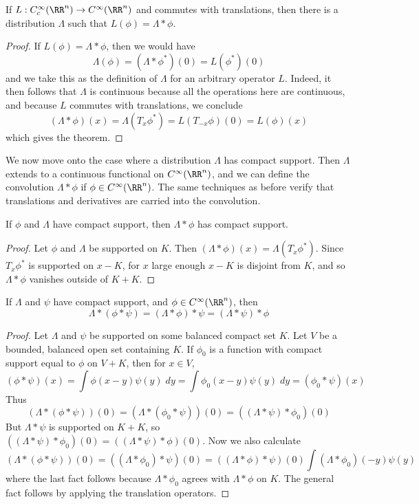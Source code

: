 \begin{theorem}
    If $L: C_c^\infty(\RR^n) \to C^\infty(\RR^n)$ and commutes with translations, then there is a distribution $\Lambda$ such that $L(\phi) = \Lambda * \phi$.
\end{theorem}
\begin{proof}
    If $L(\phi) = \Lambda * \phi$, then we would have
    \[ \Lambda(\phi) = (\Lambda * \phi^*)(0) = L(\phi^*)(0) \]
    and we take this as the definition of $\Lambda$ for an arbitrary operator $L$. Indeed, it then follows that $\Lambda$ is continuous because all the operations here are continuous, and because $L$ commutes with translations, we conclude
    \[ (\Lambda * \phi)(x) = \Lambda(T_x \phi^*) = L(T_{-x} \phi)(0) = L(\phi)(x) \]
    which gives the theorem.
\end{proof}

We now move onto the case where a distribution $\Lambda$ has compact support. Then $\Lambda$ extends to a continuous functional on $C^\infty(\RR^n)$, and we can define the convolution $\Lambda * \phi$ if $\phi \in C^\infty(\RR^n)$. The same techniques as before verify that translations and derivatives are carried into the convolution.

\begin{theorem}
    If $\phi$ and $\Lambda$ have compact support, then $\Lambda * \phi$ has compact support.
\end{theorem}
\begin{proof}
    Let $\phi$ and $\Lambda$ be supported on $K$. Then $(\Lambda * \phi)(x) = \Lambda(T_x \phi^*)$. Since $T_x \phi^*$ is supported on $x - K$, for $x$ large enough $x-K$ is disjoint from $K$, and so $\Lambda * \phi$ vanishes outside of $K + K$.
\end{proof}

\begin{theorem}
    If $\Lambda$ and $\psi$ have compact support, and $\phi \in C^\infty(\RR^n)$, then
    \[ \Lambda * (\phi * \psi) = (\Lambda * \phi) * \psi = (\Lambda * \psi) * \phi \]
\end{theorem}
\begin{proof}
    Let $\Lambda$ and $\psi$ be supported on some balanced compact set $K$. Let $V$ be a bounded, balanced open set containing $K$. If $\phi_0$ is a function with compact support equal to $\phi$ on $V + K$, then for $x \in V$,
    \[ (\phi * \psi)(x) = \int \phi(x - y) \psi(y)\; dy = \int \phi_0(x - y) \psi(y)\; dy = (\phi_0 * \psi)(x) \]
    Thus
    \[ (\Lambda * (\phi * \psi))(0) = (\Lambda * (\phi_0 * \psi))(0) = ((\Lambda * \psi) * \phi_0)(0) \]
    But $\Lambda * \psi$ is supported on $K + K$, so $((\Lambda * \psi) * \phi_0)(0) = ((\Lambda * \psi) * \phi)(0)$. Now we also calculate
    \[ (\Lambda * (\phi * \psi))(0) = ((\Lambda * \phi_0) * \psi)(0) = ((\Lambda * \phi) * \psi)(0) \int (\Lambda * \phi_0)(-y) \psi(y) \]
    where the last fact follows because $\Lambda * \phi_0$ agrees with $\Lambda * \phi$ on $K$. The general fact follows by applying the translation operators.
\end{proof}

